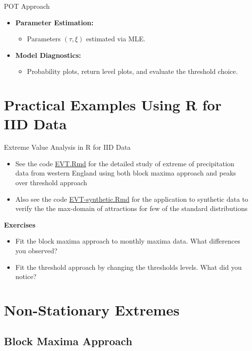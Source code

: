 \documentclass[10pt, hyperref={colorlinks = true,linkcolor = blue}]{beamer}
\begin{document}
{{\begin{frame}{POT Approach}
\begin{itemize}
\begin{itemize}
        \item \textbf{Parameter Estimation:}
        \begin{itemize}
            \item Parameters \((\tau, \xi)\) estimated via MLE.
        \end{itemize}
        
        \item \textbf{Model Diagnostics:}
        \begin{itemize}
            \item Probability plots, return level plots, and evaluate the threshold choice.
        \end{itemize}
    \end{itemize}
\end{itemize}
\end{frame}


}

{
\section{Practical Examples Using R for IID Data}

\begin{frame}{Extreme Value Analysis in R for IID Data}

\begin{itemize}
\item See the code \href{https://github.com/yadavrishikesh/Intro-EVT}{EVT.Rmd} for the detailed study of extreme of precipitation data from western England using both block maxima approach and peaks over threshold approach  
\item Also see the code \href{https://github.com/yadavrishikesh/Intro-EVT}{EVT-synthetic.Rmd} for the application to synthetic data to verify the the max-domain of attractions for few of the standard distributions
\end{itemize}
\textbf{Exercises}
\begin{itemize}
\item Fit the block maxima approach to monthly maxima data. What differences you observed?
\item Fit the threshold approach by changing the thresholds levels. What did you notice? 
\end{itemize}
\end{frame}
}


{\section{Non-Stationary Extremes}
{\subsection{Block Maxima Approach}


}}}
\end{document}
